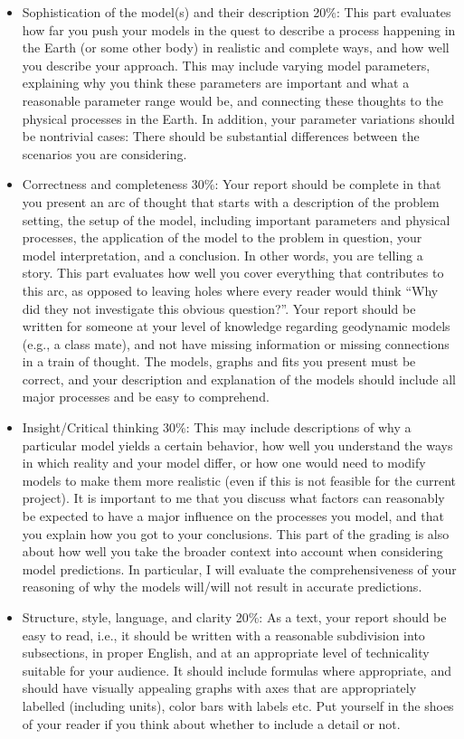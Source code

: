 \documentclass[notitlepage]{article}
\begin{document}
\begin{itemize}
\item Sophistication of the model(s) and their description 20\%: 
This part evaluates how far you push your models in the quest to describe a process happening in the Earth (or some other body) 
in realistic and complete ways, and how well you describe your approach. 
This may include varying model parameters, explaining why you think these parameters are important and what a reasonable parameter range would be, and connecting these thoughts to the physical processes in the Earth. 
In addition, your parameter variations should be nontrivial cases: There should be substantial differences between the scenarios you are considering. 

\item Correctness and completeness 30\%: 
Your report should be complete in that you present an arc of thought that starts with a description of the problem setting, 
the setup of the model, including important parameters and physical processes, 
the application of the model to the problem in question, your model interpretation, and a conclusion. 
In other words, you are telling a story. This part evaluates how well you cover everything that contributes to this arc, 
as opposed to leaving holes where every reader would think ``Why did they not investigate this obvious question?''.
Your report should be written for someone at your level of knowledge regarding geodynamic models (e.g., a class mate), and not have missing information or missing connections in a train of thought. The models, graphs and fits you present must be correct, and your description and explanation of the models should include all major processes and be easy to comprehend.

\item Insight/Critical thinking 30\%: This may include descriptions of why a particular model yields a certain behavior, 
how well you understand the ways in which reality and your model differ, 
or how one would need to modify models to make them more realistic 
(even if this is not feasible for the current project). 
It is important to me that you discuss what factors can reasonably be expected to have a major influence on the 
processes you model, and that you explain how you got to your conclusions. 
This part of the grading is also about how well you take the broader context into account when considering model predictions. In particular, I will evaluate the comprehensiveness of your reasoning of why the models will/will not result in accurate predictions.

\item Structure, style, language, and clarity 20\%: As a text, your report should be easy to read, i.e., it should be written with a reasonable subdivision into subsections,  in proper English,  and at an appropriate level of technicality suitable for your audience.  It should include formulas where appropriate, and should have visually appealing graphs with axes that are appropriately labelled (including units), color bars with labels etc. Put yourself in the shoes of your reader if you think about whether to include a detail or not. 
\end{itemize}
\end{document}

